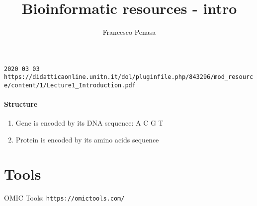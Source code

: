 \documentclass[11pt]{article}
\begin{document}
\author{Francesco Penasa}
\title{Bioinformatic resources - intro}
\maketitle

\medskip

\texttt{2020 03 03}
\texttt{https://didatticaonline.unitn.it/dol/pluginfile.php/843296/mod\_resource/content/1/Lecture1\_Introduction.pdf}

\paragraph{Structure} %
\label{par:structure}
\begin{enumerate}
	\item Gene is encoded by its DNA sequence: A C G T
	\item Protein is encoded by its amino acids sequence 
\end{enumerate}

\section{Tools} %
\label{sec:tools}
OMIC Tools: \texttt{https://omictools.com/}
\end{document}
